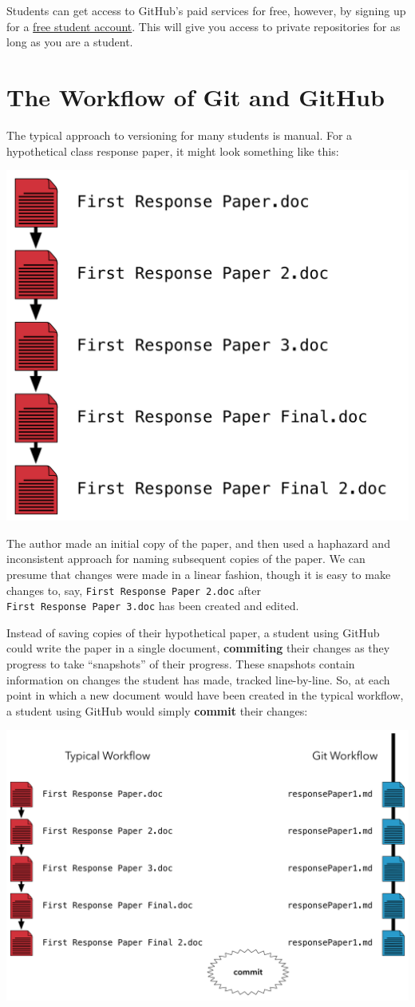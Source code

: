 \documentclass[]{book}
\theoremstyle{definition}
\theoremstyle{definition}
\theoremstyle{definition}
\theoremstyle{remark}
\begin{document}
Students can get access to GitHub's paid services for free, however, by
signing up for a \href{https://education.github.com}{free student
account}. This will give you access to private repositories for as long
as you are a student.

\section{The Workflow of Git and
GitHub}\label{the-workflow-of-git-and-github}

The typical approach to versioning for many students is manual. For a
hypothetical class response paper, it might look something like this:

\includegraphics[width=0.5\linewidth]{images/gitFlow01}

The author made an initial copy of the paper, and then used a haphazard
and inconsistent approach for naming subsequent copies of the paper. We
can presume that changes were made in a linear fashion, though it is
easy to make changes to, say, \texttt{First\ Response\ Paper\ 2.doc}
after \texttt{First\ Response\ Paper\ 3.doc} has been created and
edited.

Instead of saving copies of their hypothetical paper, a student using
GitHub could write the paper in a single document, \textbf{commiting}
their changes as they progress to take ``snapshots'' of their progress.
These snapshots contain information on changes the student has made,
tracked line-by-line. So, at each point in which a new document would
have been created in the typical workflow, a student using GitHub would
simply \textbf{commit} their changes:

\includegraphics[width=1\linewidth]{images/gitFlow02}
\end{document}
